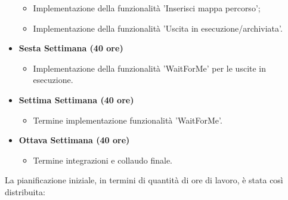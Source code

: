 \begin{itemize}
\begin{itemize}
		\item Implementazione della funzionalità 'Inserisci mappa percorso';
		\item Implementazione della funzionalità 'Uscita in esecuzione/archiviata'.
	\end{itemize}
	\item \textbf{Sesta Settimana (40 ore)} 
	\begin{itemize}
		\item Implementazione della funzionalità 'WaitForMe' per le uscite in esecuzione.
	\end{itemize}
	\item \textbf{Settima Settimana (40 ore)} 
	\begin{itemize}
		\item Termine implementazione funzionalità 'WaitForMe'.
	\end{itemize}
	\item \textbf{Ottava Settimana (40 ore)} 
	\begin{itemize}
		\item Termine integrazioni e collaudo finale.
	\end{itemize}
\end{itemize}
\newpage
La pianificazione iniziale, in termini di quantità di ore di lavoro, è stata così distribuita:
